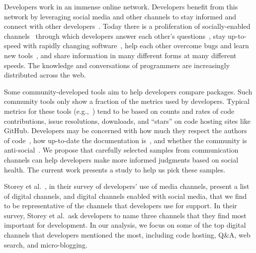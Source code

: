 Developers work in an immense online network.
Developers benefit from this network by
leveraging social media and other channels to stay informed
and connect with other developers~\cite{singer_software_2014,storey_how_2016}.
Today there is a proliferation of socially-enabled channels~\cite{storey_revolution_2014} through which developers
answer each other's questions~\cite{mamykina_fastest_2011},
stay up-to-speed with rapidly changing software~\cite{linares-vasquez_how_2014},
help each other overcome bugs and learn new tools~\cite{parnin_blogging_2013},
and share information in many different forms at many different speeds.
The knowledge and conversations of programmers are increasingly distributed across the web.

Some community-developed tools aim to help developers compare packages.
Such community tools only show a fraction of the metrics used by developers.
Typical metrics for these tools (e.g.,~\cite{awesome_python,package_quality,ruby_toolbox}) tend to be based on counts and rates of code contributions, issue resolutions, downloads, and ``stars'' on code hosting sites like GitHub.
Developers may be concerned with
how much they respect the authors of code~\cite{robillard_field_2011},
how up-to-date the documentation is~\cite{lethbridge_how_2003,nykaza_what_2002,robillard_field_2011,storey_revolution_2014},
and whether the community is anti-social~\cite{storey_revolution_2014}.
We propose that carefully selected samples from communication channels can help developers make more informed judgments based on social health.
The current work presents a study to help us pick these samples.


Storey et al.~\cite{storey_revolution_2014}, in their survey of developers' use of media channels, present a list of digital channels, and digital channels enabled with social media, that we find to be representative of the channels that developers use for support.
In their survey, Storey et al.\ ask developers to name three channels that they find most important for development.
In our analysis, we focus on some of the top digital channels that developers mentioned the most, including code hosting, Q\&A, web search, and micro-blogging.

